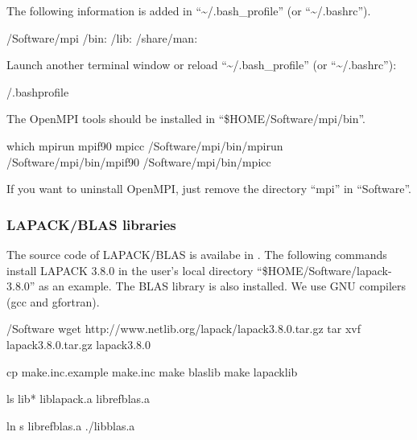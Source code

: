 \documentclass[a4paper,11pt,oneside,english]{sphinxmanual}
\begin{document}
The following information is added in “\textasciitilde{}/.bash\_profile” (or “\textasciitilde{}/.bashrc”).

\begin{sphinxVerbatim}[commandchars=\\\{\}]
/Software/mpi
 /bin:
 /lib:
 /share/man:
\end{sphinxVerbatim}

Launch another terminal window or reload “\textasciitilde{}/.bash\_profile” (or “\textasciitilde{}/.bashrc”):

\begin{sphinxVerbatim}[commandchars=\\\{\}]
\PYGZdl{}  \PYGZti{}/.bash\PYGZus{}profile
\end{sphinxVerbatim}

The OpenMPI tools should be installed in “\$HOME/Software/mpi/bin”.

\begin{sphinxVerbatim}[commandchars=\\\{\}]
\PYGZdl{} which mpirun mpif90 mpicc
\PYGZti{}/Software/mpi/bin/mpirun
\PYGZti{}/Software/mpi/bin/mpif90
\PYGZti{}/Software/mpi/bin/mpicc
\end{sphinxVerbatim}

If you want to uninstall OpenMPI, just remove the directory “mpi” in “Software”.


\subsubsection{LAPACK/BLAS libraries}
\label{\detokenize{98_Appendix:id3}}
The source code of LAPACK/BLAS is availabe in .
The following commands install LAPACK 3.8.0
in the user’s local directory “\$HOME/Software/lapack-3.8.0” as an example.
The BLAS library is also installed. We use GNU compilers (gcc and gfortran).

\begin{sphinxVerbatim}[commandchars=\\\{\}]
\PYGZdl{}  /Software
\PYGZdl{} wget http://www.netlib.org/lapack/lapack\PYGZhy{}3.8.0.tar.gz
\PYGZdl{} tar \PYGZhy{}xvf lapack\PYGZhy{}3.8.0.tar.gz
\PYGZdl{}  lapack\PYGZhy{}3.8.0

\PYGZdl{} cp make.inc.example make.inc
\PYGZdl{} make blaslib
\PYGZdl{} make lapacklib

\PYGZdl{} ls lib*
liblapack.a  librefblas.a

\PYGZdl{} ln \PYGZhy{}s librefblas.a ./libblas.a
\end{sphinxVerbatim}
\end{document}
